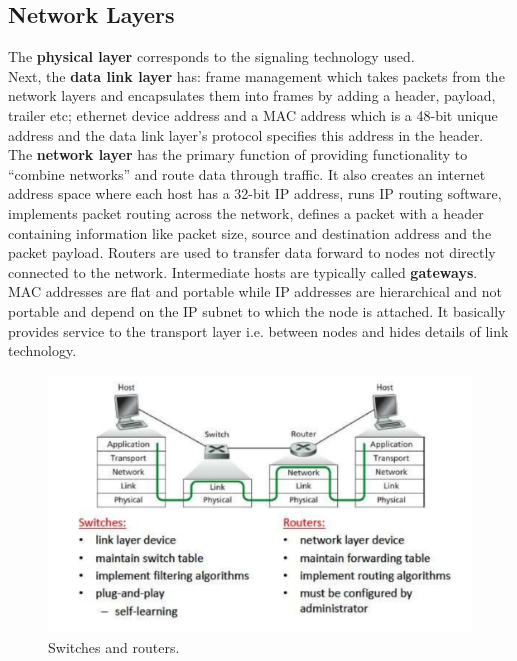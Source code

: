 \documentclass[twoside]{article}
\begin{document}
\subsection{Network Layers}
The \textbf{physical layer} corresponds to the signaling technology used.\\

Next, the \textbf{data link layer} has: frame management which takes packets from 
the network layers and encapsulates them into frames by adding a header, 
payload, trailer etc; ethernet device address and a MAC address which is a 
48-bit unique address and the data link layer's protocol specifies this 
address in the header.\\

The \textbf{network layer} has the primary function of
providing functionality to ``combine networks'' and route data through traffic.
It also creates an internet address space where each host has a 32-bit IP address,
runs IP routing software, implements packet routing across the network, defines 
a packet with a header containing information like packet size, source and 
destination address and the packet payload. Routers are used to transfer data
forward to nodes not directly connected to the network. Intermediate hosts are 
typically called \textbf{gateways}. MAC addresses are flat and portable while 
IP addresses are hierarchical and not portable and depend on the IP subnet to
which the node is attached. It basically provides service to the transport 
layer i.e. between nodes and hides details of link technology.
\begin{figure}
  \includegraphics[width=\linewidth]{switches-routers.png}
  \caption{Switches and routers.}
  \label{fig:switches-routers}
\end{figure}
\\
\end{document}
